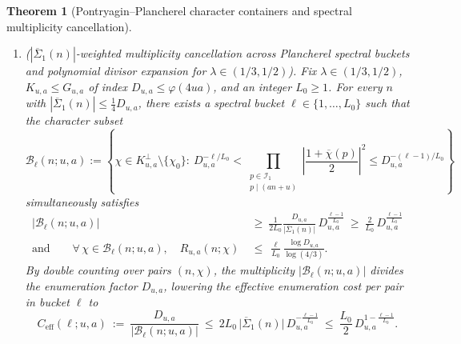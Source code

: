 \documentclass[11pt, a4paper]{article}
\theoremstyle{plain}
\newtheorem{theorem}{Theorem}[section]
\theoremstyle{definition}
\begin{document}
\begin{theorem}[Pontryagin--Plancherel character containers and spectral multiplicity cancellation]
\begin{enumerate}[label=(\alph*)]
\begin{enumerate}[label=(\roman*)]
        \item For every $\lambda\in(1/3,1/2)$ (beyond Vaughan's exponent $2/3$), the universal Quotient State~I closure bound of Theorem~\ref{thm:quotient_container_polynomial_depth} is upgraded from sub-polynomial quotient order $D_{u,a}\le\exp(c_0(\lambda)\sqrt{\log\log N})$ to \emph{polynomial quotient order} $D_{u,a}\le J^{\varepsilon}=(\log N)^{\varepsilon\lambda}$ ($\varepsilon=\frac{(1-2\lambda)^{2}}{256\lambda}$).
    \end{enumerate}
    
    \item \emph{($|\overline{\Sigma}_1(n)|$-weighted multiplicity cancellation across Plancherel spectral buckets and polynomial divisor expansion for $\lambda\in(1/3,1/2)$).} 
    Fix $\lambda\in(1/3,1/2)$, $K_{u,a}\le G_{u,a}$ of index $D_{u,a}\le\varphi(4ua)$, and an integer $L_0\ge1$. For every $n$ with $|\overline{\Sigma}_1(n)|\le\frac14 D_{u,a}$, there exists a spectral bucket $\ell\in\{1,\dots,L_0\}$ such that the character subset
    \[
    \mathcal{B}_\ell(n;u,a):=\left\{\chi\in K_{u,a}^{\perp}\setminus\{\chi_0\}:\ D_{u,a}^{-\ell/L_0}<\prod_{\substack{p\in\mathcal{I}_1\\ p\mid(an+u)}}\left|\frac{1+\overline{\chi}(p)}{2}\right|^{2}\le D_{u,a}^{-(\ell-1)/L_0}\right\}
    \]
    simultaneously satisfies
    \begin{equation}\label{eq:spectral_bucket_multiplicity_and_collisions}
    \begin{aligned}
    \big|\mathcal{B}_\ell(n;u,a)\big|\ &\ge\ \frac{1}{2L_0}\frac{D_{u,a}}{\big|\overline{\Sigma}_1(n)\big|}\,D_{u,a}^{\frac{\ell-1}{L_0}}\ \ge\ \frac{2}{L_0}\,D_{u,a}^{\frac{\ell-1}{L_0}} \\
    \text{and}\qquad\forall\,\chi\in\mathcal{B}_\ell(n;u,a),\quad R_{u,a}(n;\chi)\ &\le\ \frac{\ell}{L_0}\frac{\log D_{u,a}}{\log(4/3)}.
    \end{aligned}
    \end{equation}
    By double counting over pairs $(n,\chi)$, the multiplicity $|\mathcal{B}_\ell(n;u,a)|$ divides the enumeration factor $D_{u,a}$, lowering the effective enumeration cost per pair in bucket $\ell$ to
    \begin{equation}\label{eq:effective_enumeration_cost_bucket}
    C_{\mathrm{eff}}(\ell;u,a)\ :=\ \frac{D_{u,a}}{\big|\mathcal{B}_\ell(n;u,a)\big|}\ \le\ 2L_0\,\big|\overline{\Sigma}_1(n)\big|\,D_{u,a}^{-\frac{\ell-1}{L_0}}\ \le\ \frac{L_0}{2}\,D_{u,a}^{1-\frac{\ell-1}{L_0}}.
    \end{equation}

\end{enumerate}
\end{theorem}
\end{document}
